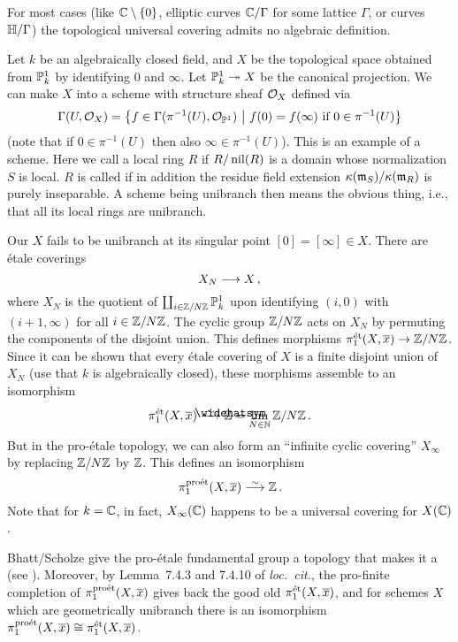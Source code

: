 \begin{exm}\label{exm:crippledP1}
	For most cases (like $\mathbb{C}\setminus\{0\}$, elliptic curves $\mathbb{C}/\Gamma$ for some lattice $\Gamma$, or curves $\mathbb{H}/\Gamma$) the topological universal covering admits no algebraic definition.
	
	Let $k$ be an algebraically closed field, and $X$ be the topological space obtained from $\mathbb{P}_k^1$ by identifying $0$ and $\infty$. Let $\IP_k^1\epimorphism X$ be the canonical projection. We can make $X$ into a scheme with structure sheaf $\mathcal{O}_X$ defined via
	\begin{equation*}
		\operatorname{\Gamma}(U,\mathcal{O}_X)=\left\{f\in\operatorname{\Gamma}(\pi^{-1}(U),\mathcal{O}_{\mathbb{P}^1})\ \middle|\  f(0)=f(\infty)\text{ if }0\in\pi^{-1}(U)\right\}
	\end{equation*}
	(note that if $0\in\pi^{-1}(U)$ then also $\infty\in\pi^{-1}(U)$). This is an example of a  scheme. Here we call a local ring $R$  if $R/\operatorname{nil}(R)$ is a domain whose normalization $S$ is local. $R$ is called  if in addition the residue field extension $\kappa(\mathfrak{m}_S)/\kappa(\mathfrak{m}_R)$ is purely inseparable. A scheme being unibranch then means the obvious thing, i.e., that all its local rings are unibranch.
	
	Our $X$ fails to be unibranch at its singular point $[0]=[\infty]\in X$. There are étale coverings
	\begin{equation*}
		X_N\morphism X\,,
	\end{equation*}
	where $X_N$ is the quotient of $\coprod_{i\in\mathbb{Z}/N\mathbb{Z}}\mathbb{P}_k^1$ upon identifying $(i,0)$ with $(i+1,\infty)$ for all $i\in\mathbb{Z}/N\mathbb{Z}$. The cyclic group $\mathbb{Z}/N\mathbb{Z}$ acts on $X_N$ by permuting the components of the disjoint union. This defines morphisms $\pi_1^\et(X,\ov{x})\morphism\IZ/N\IZ$. Since it can be shown that every étale covering of $X$ is a finite disjoint union of $X_N$ (use that $k$ is algebraically closed), these morphisms assemble to an isomorphism
	\begin{equation*}
		\pi_1^\et(X,\ov{x})\isomorphism\roof{\IZ}=\limit_{N\in\IN}\IZ/N\IZ\,.
	\end{equation*}
	But in the pro-étale topology, we can also form an \enquote{infinite cyclic covering} $X_\infty$ by replacing $\mathbb{Z}/N\mathbb{Z}$ by $\mathbb{Z}$. This defines an isomorphism
	\begin{equation*}
		\pi_1^\proet(X,\ov{x})\isomorphism \IZ\,.
	\end{equation*}
	Note that for $k=\mathbb{C}$, in fact, $X_\infty(\mathbb{C})$ happens to be a universal covering for $X(\mathbb{C})$.
	
	Bhatt/Scholze give the pro-étale fundamental group a topology that makes it a  (see \cite[Definition~7.1.1]{proetale}). Moreover, by Lemma~7.4.3 and 7.4.10 of \emph{loc.\ cit.}, the pro-finite completion of $\pi_1^\proet(X,\ov{x})$ gives back the good old $\pi_1^\et(X,\ov{x})$, and for schemes $X$ which are geometrically unibranch there is an isomorphism $\pi_1^\proet(X,\ov{x})\cong \pi_1^\et(X,\ov{x})$.
\end{exm}
